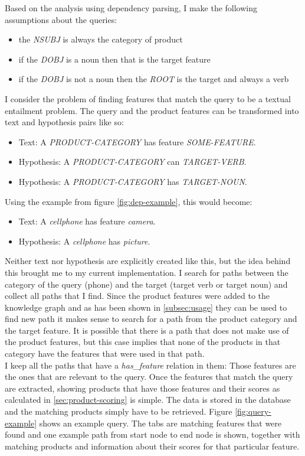 Based on the analysis using dependency parsing, I make the following assumptions about the queries:
\begin{itemize}
    \item the \textit{NSUBJ} is always the category of product
    \item if the \textit{DOBJ} is a noun then that is the target feature
    \item if the \textit{DOBJ} is not a noun then the \textit{ROOT} is the target and always a verb
\end{itemize}
I consider the problem of finding features that match the query to be a textual entailment problem. The query and the product features can be transformed into text and hypothesis pairs like so:
\begin{itemize}
    \item Text: A \textit{PRODUCT-CATEGORY} has feature \textit{SOME-FEATURE}.
    \item Hypothesis: A \textit{PRODUCT-CATEGORY} can \textit{TARGET-VERB}.
    \item Hypothesis: A \textit{PRODUCT-CATEGORY} has \textit{TARGET-NOUN}.
\end{itemize}
Using the example from figure \ref{fig:dep-example}, this would become:
\begin{itemize}
    \item Text: A \textit{cellphone} has feature \textit{camera}.
    \item Hypothesis: A \textit{cellphone} has \textit{picture}.
\end{itemize}

Neither text nor hypothesis are explicitly created like this, but the idea behind this brought me to my current implementation. I search for paths between the category of the query (phone) and the target (target verb or target noun) and collect all paths that I find. Since the product features were added to the knowledge graph and as has been shown in \ref{subsec:usage} they can be used to find new path it makes sense to search for a path from the product category and the target feature. It is possible that there is a path that does not make use of the product features, but this case implies that none of the products in that category have the features that were used in that path.\\
I keep all the paths that have a \textit{has\_feature} relation in them: Those features are the ones that are relevant to the query. Once the features that match the query are extracted, showing products that have those features and their scores as calculated in \ref{sec:product-scoring} is simple. The data is stored in the database and the matching products simply have to be retrieved. Figure \ref{fig:query-example} shows an example query. The tabs are matching features that were found and one example path from start node to end node is shown, together with matching products and information about their scores for that particular feature.

